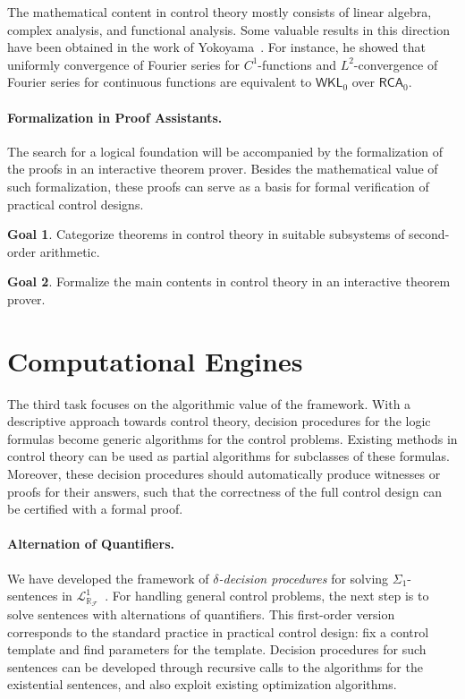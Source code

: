\documentclass[10pt]{article}
\newcommand{\lrf}{\mathcal{L}_{\mathbb{R}_{\mathcal{F}}}}
\theoremstyle{definition}
\newtheorem{goal}{Goal}
\begin{document}
The mathematical content in control theory mostly consists of linear algebra, complex analysis, and functional analysis. Some valuable results in this direction have been obtained in the work of Yokoyama~\cite{yoko}. For instance, he showed that uniformly convergence of Fourier series for $C^1$-functions and $L^2$-convergence of Fourier series for continuous functions are equivalent to $\mathsf{WKL}_0$ over $\mathsf{RCA}_0$. 

\paragraph{Formalization in Proof Assistants.} The search for a logical foundation will be accompanied by the formalization of the proofs in an interactive theorem prover. Besides the mathematical value of such formalization, these proofs can serve as a basis for formal verification of practical control designs. 

\begin{goal}
Categorize theorems in control theory in suitable subsystems of second-order arithmetic. 
\end{goal}
\begin{goal}
Formalize the main contents in control theory in an interactive theorem prover.  
\end{goal}



\section{Computational Engines}


The third task focuses on the algorithmic value of the framework. With a descriptive approach towards control theory, decision procedures for the logic formulas become generic algorithms for the control problems. Existing methods in control theory can be used as partial algorithms for subclasses of these formulas. Moreover, these decision procedures should automatically produce witnesses or proofs for their answers, such that the correctness of the full control design can be certified with a formal proof.

\paragraph{Alternation of Quantifiers.} We have developed the framework of {\em $\delta$-decision procedures} for solving $\Sigma_1$-sentences in $\lrf^1$~\cite{DBLP:conf/cade/GaoAC12}. For handling general control problems, the next step is to solve sentences with alternations of quantifiers. This first-order version corresponds to the standard practice in practical control design: fix a control template and find parameters for the template. Decision procedures for such sentences can be developed through recursive calls to the algorithms for the existential sentences, and also exploit existing optimization algorithms. 
\end{document}
